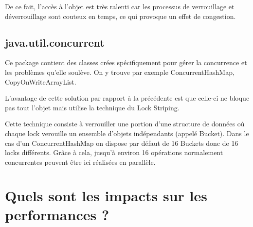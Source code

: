 \documentclass{report}
\begin{document}
			De ce fait, l'accès à l'objet est très ralenti car les processus de verrouillage et déverrouillage sont couteux en temps, ce qui provoque un effet de congestion.		

		\section{java.util.concurrent}

			Ce package contient des classes crées spécifiquement pour gérer la concurrence et les problèmes qu'elle soulève.
			On y trouve par exemple ConcurrentHashMap, CopyOnWriteArrayList.

			L'avantage de cette solution par rapport à la précédente est que celle-ci ne bloque pas tout l'objet mais utilise la technique du Lock Striping.


			Cette technique consiste à verrouiller une portion d'une structure de données où chaque lock verouille un ensemble d'objets indépendants (appelé Bucket).
			Dans le cas d'un ConcurrentHashMap on dispose par défaut de 16 Buckets donc de 16 locks différents.
			Grâce à cela, jusqu'à environ 16 opérations normalement concurrentes peuvent être ici réalisées en parallèle.
			

	\chapter{Quels sont les impacts sur les performances ?}
\end{document}
